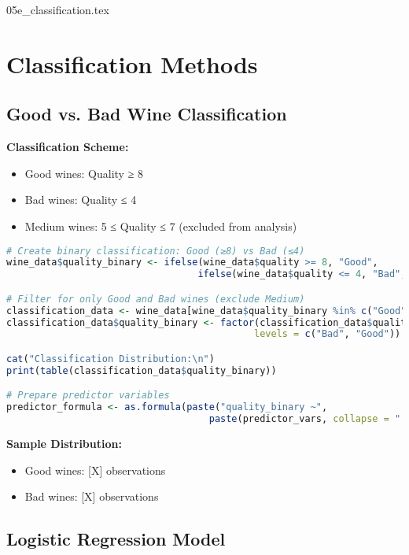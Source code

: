 05e_classification.tex

\section{Classification Methods}

\subsection{Good vs. Bad Wine Classification}

\textbf{Classification Scheme:}
\begin{itemize}
    \item Good wines: Quality ≥ 8
    \item Bad wines: Quality ≤ 4
    \item Medium wines: 5 ≤ Quality ≤ 7 (excluded from analysis)
\end{itemize}

\begin{lstlisting}[language=R, caption=Binary Classification Setup]
# Create binary classification: Good (≥8) vs Bad (≤4)
wine_data$quality_binary <- ifelse(wine_data$quality >= 8, "Good",
                                  ifelse(wine_data$quality <= 4, "Bad", "Medium"))

# Filter for only Good and Bad wines (exclude Medium)
classification_data <- wine_data[wine_data$quality_binary %in% c("Good", "Bad"), ]
classification_data$quality_binary <- factor(classification_data$quality_binary, 
                                            levels = c("Bad", "Good"))

cat("Classification Distribution:\n")
print(table(classification_data$quality_binary))

# Prepare predictor variables
predictor_formula <- as.formula(paste("quality_binary ~", 
                                    paste(predictor_vars, collapse = " + ")))
\end{lstlisting}

\textbf{Sample Distribution:}
\begin{itemize}
    \item Good wines: [X] observations
    \item Bad wines: [X] observations
\end{itemize}

\subsection{Logistic Regression Model}

